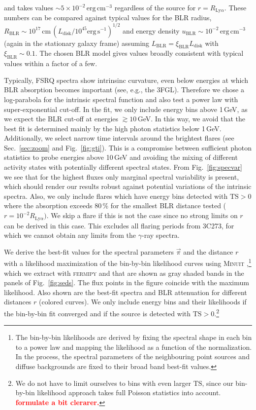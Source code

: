 \documentclass[twocolumn]{aastex62}
\newcommand{\gray}{$\gamma$-ray\xspace}
\newcommand{\todo}[1]{\textbf{\textcolor{red}{#1}}}
\begin{document}
and takes values $\sim 5\times10^{-2}\,\mathrm{erg}\,\mathrm{cm}^{-3}$ regardless of the source for $r = R_{\mathrm{Ly}\alpha}$.
These numbers can be compared against typical values for the BLR radius, $R_\mathrm{BLR} \sim 10^{17}\,\mathrm{cm}\, (L_\mathrm{disk} / 10^{45} \mathrm{erg}\,\mathrm{s}^{-1})^{1/2}$ \citep[e.g.][]{2007ApJ...659..997K,2009ApJ...697..160B} and energy density $u_\mathrm{BLR} \sim 10^{-2}\,\mathrm{erg}\,\mathrm{cm}^{-3} $ (again in the stationary galaxy frame) assuming  $L_\mathrm{BLR} = \xi_\mathrm{BLR} L_\mathrm{disk}$ with $\xi_\mathrm{BLR}\sim 0.1$. 
The chosen BLR model gives values broadly consistent with typical values within a factor of a few.

Typically, FSRQ spectra show intrinsinc curvature, even below energies at which BLR absorption becomes important (see, e.g., the 3FGL). Therefore we chose a log-parabola for the intrinsic spectral function and also test a power law with super-exponential cut-off. 
In the fit, we only include energy bins above 1\,GeV, as we expect the BLR cut-off at energies $\gtrsim 10\,$GeV. In this way, we avoid that the best fit is determined mainly by the high photon statistics below 1\,GeV.
Additionally, we select narrow time intervals around the brightest flares (see Sec.~\ref{sec:zoom} and Fig.~\ref{fig:gti}).
This is a compromise between sufficient photon statistics to probe energies above 10\,GeV and avoiding the mixing of different activity states with potentially different spectral states. 
From Fig.~\ref{fig:specvar} we see that for the highest fluxes only marginal spectral variability is present, which should render our results robust against potential variations of the intrinsic spectra. 
Also, we only include flares which have energy bins detected with $\mathrm{TS} > 0$ where the absorption exceeds 80\,\% for the smallest BLR distance tested ($r = 10^{-2}R_{\mathrm{Ly}\alpha})$. 
We skip a flare if this is not the case since no strong limits on $r$ can be derived in this case.
This excludes all flaring periods from 3C273, for which we cannot obtain any limits from the \gray spectra.

We derive the best-fit values for the spectral parameters $\vec{\pi}$ and the distance $r$ with a likelihood maximization of the bin-by-bin likelihood curves using \textsc{Minuit} \citep{},\footnote{The bin-by-bin likelihoods are derived by fixing the spectral shape in each bin to a power law and mapping the likelihood as a function of the normalization. In the process, the spectral parameters of the neighbouring point sources and diffuse backgrounds are fixed to their broad band best-fit values.} which we extract with \textsc{fermipy} and that are shown as gray shaded bands in the panels of Fig.~\ref{fig:seds}. 
The flux points in the figure coincide with the maximum likelihood. 
Also shown are the best-fit spectra and BLR attenuation for different distances $r$ (colored curves). 
We only include energy bins and their likelihoods if the bin-by-bin fit converged and if the source is detected with $\mathrm{TS} > 0$.\footnote{We do not have to limit ourselves to bins with even larger $\mathrm{TS}$, since our bin-by-bin likelihood approach takes full Poisson statistics into account. \todo{formulate a bit clerarer.}}
\end{document}

